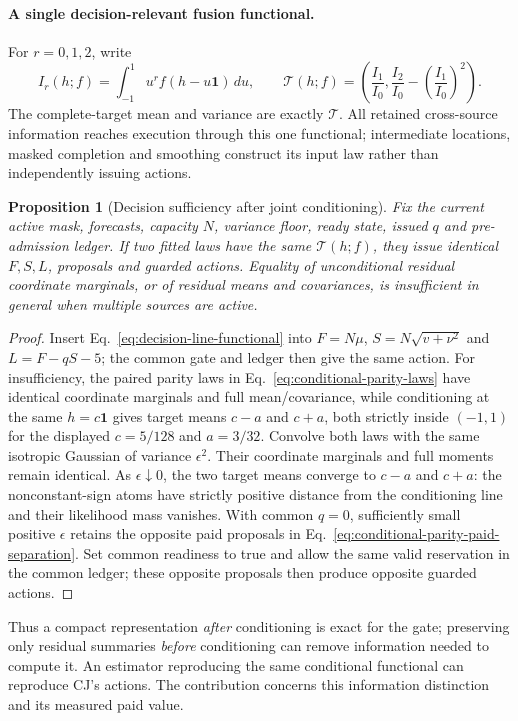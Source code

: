 \documentclass[10pt]{article}
\newtheorem{proposition}{Proposition}
\begin{document}
\paragraph{A single decision-relevant fusion functional.}
For $r=0,1,2$, write
\begin{equation}
 I_r(h;f)=\int_{-1}^{1}u^r f(h-u\mathbf1)\,du,\qquad
 \mathcal T(h;f)=
 \left(\frac{I_1}{I_0},
       \frac{I_2}{I_0}-\left(\frac{I_1}{I_0}\right)^2\right).
 \label{eq:decision-line-functional}
\end{equation}
The complete-target mean and variance are exactly $\mathcal T$.
All retained cross-source information reaches execution through this
one functional; intermediate locations, masked completion and smoothing
construct its input law rather than independently issuing actions.

\begin{proposition}[Decision sufficiency after joint conditioning]
\label{prop:line-functional-sufficiency}
Fix the current active mask, forecasts, capacity $N$, variance floor,
ready state, issued $q$ and pre-admission ledger. If two fitted laws have
the same $\mathcal T(h;f)$, they issue identical $F,S,L$, proposals and
guarded actions. Equality of unconditional residual coordinate marginals,
or of residual means and covariances, is insufficient in general when
multiple sources are active.
\end{proposition}
\begin{proof}
Insert Eq.~\eqref{eq:decision-line-functional} into
$F=N\mu$, $S=N\sqrt{v+\nu^2}$ and $L=F-qS-5$; the common gate and
ledger then give the same action. For insufficiency, the paired parity
laws in Eq.~\eqref{eq:conditional-parity-laws} have identical coordinate
marginals and full mean/covariance, while conditioning at the same
$h=c\mathbf1$ gives target means $c-a$ and $c+a$, both strictly inside
$(-1,1)$ for the displayed $c=5/128$ and $a=3/32$. Convolve both laws
with the same isotropic Gaussian of variance $\epsilon^2$. Their
coordinate marginals and full moments remain identical. As
$\epsilon\downarrow0$, the two target means converge to $c-a$ and
$c+a$: the nonconstant-sign atoms have strictly positive distance from
the conditioning line and their likelihood mass vanishes. With common
$q=0$, sufficiently small positive $\epsilon$ retains the opposite
paid proposals in Eq.~\eqref{eq:conditional-parity-paid-separation}.
Set common readiness to true and allow the same valid reservation in the
common ledger; these opposite proposals then produce opposite guarded actions.
\end{proof}
Thus a compact representation \emph{after} conditioning is exact for the
gate; preserving only residual summaries \emph{before} conditioning can
remove information needed to compute it. An estimator reproducing the
same conditional functional can reproduce CJ's actions. The contribution
concerns this information distinction and its measured paid value.
\end{document}
